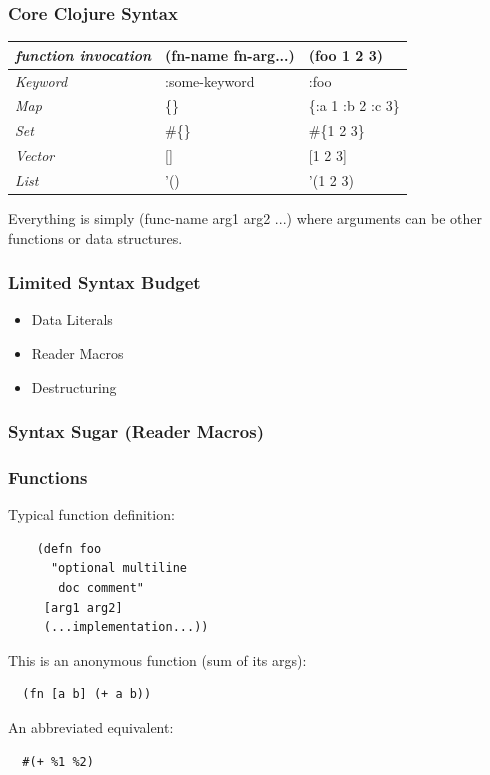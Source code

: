 \documentclass{beamer}
\begin{document}
\begin{frame}
  \frametitle{Core Clojure Syntax}
  \begin{tabularx}{\textwidth}{ |X|X|X| }
    \hline
    \emph{function invocation} & (fn-name fn-arg...)  &  (foo 1 2 3) \\ 
    \hline
    \emph{Keyword} & :some-keyword  & :foo \\ 
    \hline
    \emph{Map} &    \{\}  & \{:a 1 :b 2 :c 3\} \\ 
    \hline
    \emph{Set} &    \#\{\} & \#\{1 2 3\} \\ 
    \hline
    \emph{Vector} & []  & [1 2 3] \\
    \hline
    \emph{List} & '() & '(1 2 3) \\
    \hline
  \end{tabularx}

  \vspace{.5cm}
  Everything is simply (func-name arg1 arg2 ...) where arguments can
  be other functions or data structures. 
\end{frame}

\begin{frame}
\frametitle{Limited Syntax Budget}
\begin{itemize}
  \item Data Literals 
  \item Reader Macros
  \item Destructuring
\end{itemize}
\end{frame}

\begin{frame}
\frametitle{Syntax Sugar (Reader Macros)}
%
%
\end{frame}

\begin{frame}[fragile]
  \frametitle{Functions}
  Typical function definition:
  \begin{verbatim}
    (defn foo 
      "optional multiline 
       doc comment" 
     [arg1 arg2]
     (...implementation...))
  \end{verbatim}
  \vspace{1 cm}

  This is an anonymous function (sum of its args):
  \begin{verbatim}
  (fn [a b] (+ a b))   
  \end{verbatim}
  \vspace{1 cm}

  An abbreviated equivalent:
  \begin{verbatim}
  #(+ %1 %2)
  \end{verbatim}
\end{frame}
\end{document}
